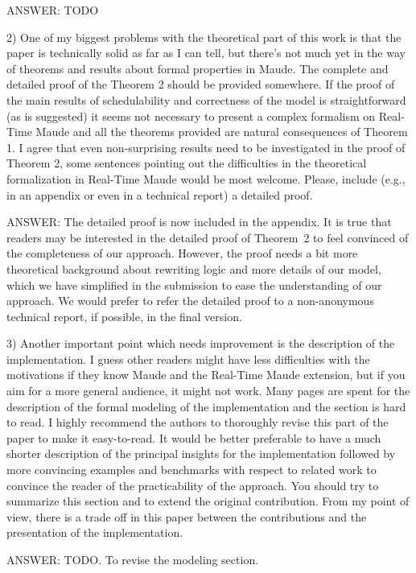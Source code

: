 \documentclass[10pt,journal]{IEEEtran}
\begin{document}
ANSWER: TODO

2) One of my biggest problems with the theoretical part of this work
is that the paper is technically solid as far as I can tell, but
there's not much yet in the way of theorems and results about formal
properties in Maude. The complete and detailed proof of the Theorem 2
should be provided somewhere. If the proof of the main results of
schedulability and correctness of the model is straightforward (as is
suggested) it seems not necessary to present a complex formalism on
Real-Time Maude and all the theorems provided are natural consequences
of Theorem 1. I agree that even non-surprising results need to be
investigated in the proof of Theorem 2, some sentences pointing out
the difficulties in the theoretical formalization in Real-Time Maude
would be most welcome. Please, include (e.g., in an appendix or even
in a technical report) a detailed proof.

ANSWER: The detailed proof is now included in the appendix. It is true
that readers may be interested in the detailed proof of Theorem~2 to
feel convinced of the completeness of our approach. However, the proof
needs a bit more theoretical background about rewriting logic and more
details of our model, which we have simplified in the submission to
ease the understanding of our approach. We would prefer to refer the
detailed proof to a non-anonymous technical report, if possible, in
the final version.

3) Another important point which needs improvement is the description
of the implementation. I guess other readers might have less
difficulties with the motivations if they know Maude and the Real-Time
Maude extension, but if you aim for a more general audience, it might
not work. Many pages are spent for the description of the formal
modeling of the implementation and the section is hard to read. I
highly recommend the authors to thoroughly revise this part of the
paper to make it easy-to-read. It would be better preferable to have a
much shorter description of the principal insights for the
implementation followed by more convincing examples and benchmarks
with respect to related work to convince the reader of the
practicability of the approach. You should try to summarize this
section and to extend the original contribution. From my point of
view, there is a trade off in this paper between the contributions and
the presentation of the implementation.

ANSWER: TODO. To revise the modeling section.
\end{document}
